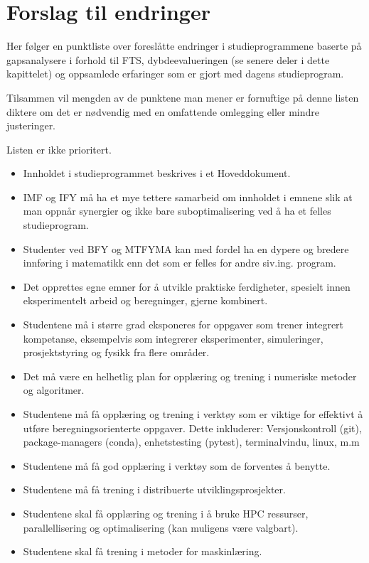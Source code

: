 \section{Forslag til endringer}
\label{sec:changes}

Her følger en punktliste over foreslåtte endringer i studieprogrammene baserte på gapsanalysere i forhold til FTS, dybdeevalueringen (se senere deler i dette kapittelet) og oppsamlede erfaringer som er gjort med dagens studieprogram.

Tilsammen vil mengden av de punktene man mener er fornuftige på denne listen diktere om det er nødvendig med en omfattende omlegging eller mindre justeringer.

Listen er ikke prioritert.

\begin{itemize}
	\item Innholdet i studieprogrammet beskrives i et Hoveddokument.
	\item IMF og IFY må ha et mye tettere samarbeid om innholdet i emnene slik at man oppnår synergier og ikke bare suboptimalisering ved å ha et felles studieprogram.
	\item Studenter ved BFY og MTFYMA kan med fordel ha en dypere og bredere innføring i matematikk enn det som er felles for andre siv.ing. program.
	\item Det opprettes egne emner for å utvikle praktiske ferdigheter, spesielt innen eksperimentelt arbeid og beregninger, gjerne kombinert.
	\item Studentene må i større grad eksponeres for oppgaver som trener integrert kompetanse, eksempelvis som integrerer eksperimenter, simuleringer, prosjektstyring og fysikk fra flere områder.
	\item Det må være en helhetlig plan for opplæring og trening i numeriske metoder og algoritmer.
	\item Studentene må få opplæring og trening i verktøy som er viktige for effektivt å utføre beregningsorienterte oppgaver. Dette inkluderer: Versjonskontroll (git), package-managers (conda), enhetstesting (pytest), terminalvindu, linux, m.m
	\item Studentene må få god opplæring i verktøy som de forventes å benytte.
	\item Studentene må få trening i distribuerte utviklingsprosjekter.
	\item Studentene skal få opplæring og trening i å bruke HPC ressurser, parallellisering og optimalisering (kan muligens være valgbart).
	\item Studentene skal få trening i metoder for maskinlæring.

\end{itemize}

